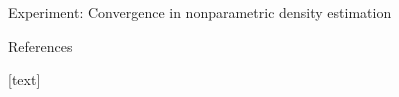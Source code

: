 \begin{frame}
\begin{columns}
\begin{column}{.32\linewidth}
\begin{block}{Experiment: Convergence in nonparametric density estimation}
\end{block}


\vspace{-0.75cm}
\begin{block}{References}


\begin{minipage}{.9\linewidth}
{\footnotesize
\begin{multicols}{2}
[text] 
 
\scriptsize
 \ 
\end{multicols}
} 
\end{minipage}
\end{block}

\end{column}
\end{columns}

\end{frame}

